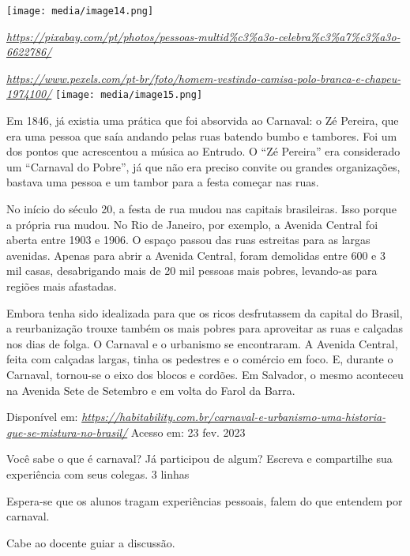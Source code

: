 \texttt{[image: media/image14.png]}

\href{https://pixabay.com/pt/photos/pessoas-multid\%c3\%a3o-celebra\%c3\%a7\%c3\%a3o-6622786/}{\emph{https://pixabay.com/pt/photos/pessoas-multid\%c3\%a3o-celebra\%c3\%a7\%c3\%a3o-6622786/}}

\href{https://www.pexels.com/pt-br/foto/homem-vestindo-camisa-polo-branca-e-chapeu-1974100/}{\emph{https://www.pexels.com/pt-br/foto/homem-vestindo-camisa-polo-branca-e-chapeu-1974100/}}
\texttt{[image: media/image15.png]}

Em 1846, já existia uma prática que foi absorvida ao Carnaval: o Zé
Pereira, que era uma pessoa que saía andando pelas ruas batendo bumbo e
tambores. Foi um dos pontos que acrescentou a música ao Entrudo. O ``Zé
Pereira'' era considerado um ``Carnaval do Pobre'', já que não era
preciso convite ou grandes organizações, bastava uma pessoa e um tambor
para a festa começar nas ruas.

No início do século 20, a festa de rua mudou nas capitais brasileiras.
Isso porque a própria rua mudou. No Rio de Janeiro, por exemplo, a
Avenida Central foi aberta entre 1903 e 1906. O espaço passou das ruas
estreitas para as largas avenidas. Apenas para abrir a Avenida Central,
foram demolidas entre 600 e 3 mil casas, desabrigando mais de 20 mil
pessoas mais pobres, levando-as para regiões mais afastadas.

Embora tenha sido idealizada para que os ricos desfrutassem da capital
do Brasil, a reurbanização trouxe também os mais pobres para aproveitar
as ruas e calçadas nos dias de folga. O Carnaval e o urbanismo se
encontraram. A Avenida Central, feita com calçadas largas, tinha os
pedestres e o comércio em foco. E, durante o Carnaval, tornou-se o eixo
dos blocos e cordões. Em Salvador, o mesmo aconteceu na Avenida Sete de
Setembro e em volta do Farol da Barra.

Disponível em:
\href{https://habitability.com.br/carnaval-e-urbanismo-uma-historia-que-se-mistura-no-brasil/}{\emph{https://habitability.com.br/carnaval-e-urbanismo-uma-historia-que-se-mistura-no-brasil/}}
Acesso em: 23 fev. 2023

Você sabe o que é carnaval? Já participou de algum? Escreva e
compartilhe sua experiência com seus colegas. 3 linhas

Espera-se que os alunos tragam experiências pessoais, falem do que
entendem por carnaval.

Cabe ao docente guiar a discussão.

